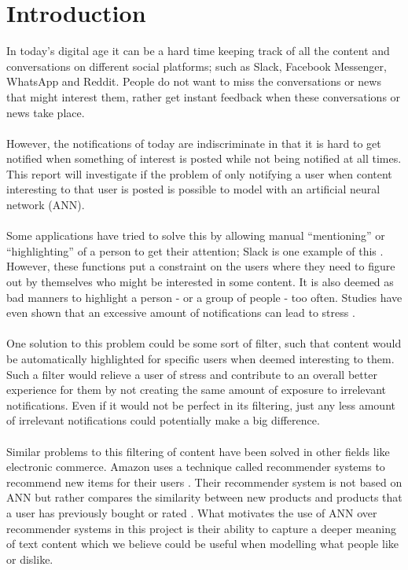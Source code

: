 \chapter{Introduction}

In today’s digital age it can be a hard time keeping track of all the content and conversations on different social platforms; such as Slack, Facebook Messenger, WhatsApp and Reddit. People do not want to miss the conversations or news that might interest them, rather get instant feedback when these conversations or news take place. 
\\\\
However, the notifications of today are indiscriminate in that it is hard to get notified when something of interest is posted while not being notified at all times. This report will investigate if the problem of only notifying a user when content interesting to that user is posted is possible to model with an artificial neural network (ANN). 
\\\\
Some applications have tried to solve this by allowing manual “mentioning” or “highlighting” of a person to get their attention; Slack is one example of this \parencite{slack}. However, these functions put a constraint on the users where they need to figure out by themselves who might be interested in some content. It is also deemed as bad manners to highlight a person - or a group of people - too often. Studies have even shown that an excessive amount of notifications can lead to stress \parencite{relaffinity}.
\\\\
One solution to this problem could be some sort of filter, such that content would be automatically highlighted for specific users when deemed interesting to them. Such a filter would relieve a user of stress and contribute to an overall better experience for them by not creating the same amount of exposure to irrelevant notifications. Even if it would not be perfect in its filtering, just any less amount of irrelevant notifications could potentially make a big difference.
\\\\
Similar problems to this filtering of content have been solved in other fields like electronic commerce. Amazon uses a technique called recommender systems to recommend new items for their users \parencite{amazonfiltering}. Their recommender system is not based on ANN but rather compares the similarity between new products and products that a user has previously bought or rated \parencite{amazonfiltering}. What motivates the use of ANN over recommender systems in this project is their ability to capture a deeper meaning of text content which we believe could be useful when modelling what people like or dislike. 

